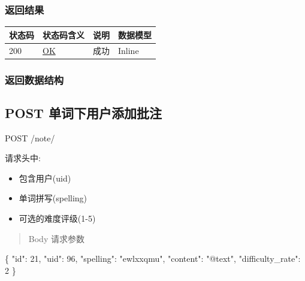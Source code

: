 \documentclass[
]{article}
\newenvironment{Shaded}{}{}
\newcommand{\DataTypeTok}[1]{\textcolor[rgb]{0.56,0.13,0.00}{#1}}
\newcommand{\DecValTok}[1]{\textcolor[rgb]{0.25,0.63,0.44}{#1}}
\newcommand{\FunctionTok}[1]{\textcolor[rgb]{0.02,0.16,0.49}{#1}}
\newcommand{\StringTok}[1]{\textcolor[rgb]{0.25,0.44,0.63}{#1}}
\begin{document}
\hypertarget{ux8fd4ux56deux7ed3ux679c-2}{%
\subsubsection{返回结果}\label{ux8fd4ux56deux7ed3ux679c-2}}

\begin{longtable}[]{@{}llll@{}}
\toprule
状态码 & 状态码含义 & 说明 & 数据模型 \\
\midrule
\endhead
200 & \href{https://tools.ietf.org/html/rfc7231\#section-6.3.1}{OK} &
成功 & Inline \\
\bottomrule
\end{longtable}

\hypertarget{ux8fd4ux56deux6570ux636eux7ed3ux6784-2}{%
\subsubsection{返回数据结构}\label{ux8fd4ux56deux6570ux636eux7ed3ux6784-2}}

\hypertarget{post-ux5355ux8bcdux4e0bux7528ux6237ux6dfbux52a0ux6279ux6ce8}{%
\subsection{POST
单词下用户添加批注}\label{post-ux5355ux8bcdux4e0bux7528ux6237ux6dfbux52a0ux6279ux6ce8}}

POST /note/

请求头中:

\begin{itemize}
\item
  包含用户(uid)
\item
  单词拼写(spelling)
\item
  可选的难度评级(1-5)
\end{itemize}

\begin{quote}
Body 请求参数
\end{quote}

\begin{Shaded}
\begin{Highlighting}[]
\FunctionTok{\{}
  \DataTypeTok{"id"}\FunctionTok{:} \DecValTok{21}\FunctionTok{,}
  \DataTypeTok{"uid"}\FunctionTok{:} \DecValTok{96}\FunctionTok{,}
  \DataTypeTok{"spelling"}\FunctionTok{:} \StringTok{"ewlxxqmu"}\FunctionTok{,}
  \DataTypeTok{"content"}\FunctionTok{:} \StringTok{"@text"}\FunctionTok{,}
  \DataTypeTok{"difficulty\_rate"}\FunctionTok{:} \DecValTok{2}
\FunctionTok{\}}
\end{Highlighting}
\end{Shaded}
\end{document}

